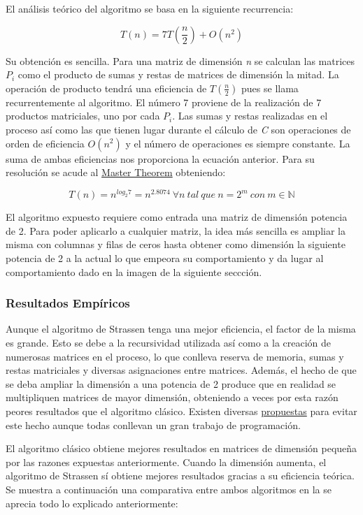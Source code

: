 \documentclass[]{article}
\begin{document}
El análisis teórico del algoritmo se basa en la siguiente recurrencia:

\[ T(n) = 7T(\frac{n}{2}) + O(n^2) \]

Su obtención es sencilla. Para una matriz de dimensión \emph{n} se
calculan las matrices $P_i$ como el producto de sumas y restas de
matrices de dimensión la mitad. La operación de producto tendrá una
eficiencia de $T(\frac{n}{2})$ pues se llama recurrentemente al
algoritmo. El número 7 proviene de la realización de 7 productos
matriciales, uno por cada $P_i$. Las sumas y restas realizadas en el
proceso así como las que tienen lugar durante el cálculo de \emph{C} son
operaciones de orden de eficiencia $O(n^2)$ y el número de operaciones
es siempre constante. La suma de ambas eficiencias nos proporciona la
ecuación anterior. Para su resolución se acude al
\href{http://en.wikipedia.org/wiki/Master_theorem}{Master Theorem}
obteniendo:

\[ T(n) = n^{log_2 7} = n^{2.8074} \ \forall n \ tal \ que \ n = 2^m \ con \ m \in \mathbb{N} \]

El algoritmo expuesto requiere como entrada una matriz de dimensión
potencia de 2. Para poder aplicarlo a cualquier matriz, la idea más
sencilla es ampliar la misma con columnas y filas de ceros hasta obtener
como dimensión la siguiente potencia de 2 a la actual lo que empeora su
comportamiento y da lugar al comportamiento dado en la imagen de la
siguiente seccción.

\subsubsection{Resultados Empíricos}\label{resultados-empiricos-3}

Aunque el algoritmo de Strassen tenga una mejor eficiencia, el factor de
la misma es grande. Esto se debe a la recursividad utilizada así como a
la creación de numerosas matrices en el proceso, lo que conlleva reserva
de memoria, sumas y restas matriciales y diversas asignaciones entre
matrices. Además, el hecho de que se deba ampliar la dimensión a una
potencia de 2 produce que en realidad se multipliquen matrices de mayor
dimensión, obteniendo a veces por esta razón peores resultados que el
algoritmo clásico. Existen diversas
\href{www.cs.duke.edu/~alvy/papers/sc98/}{propuestas} para evitar este
hecho aunque todas conllevan un gran trabajo de programación.

El algoritmo clásico obtiene mejores resultados en matrices de dimensión
pequeña por las razones expuestas anteriormente. Cuando la dimensión
aumenta, el algoritmo de Strassen sí obtiene mejores resultados gracias
a su eficiencia teórica. Se muestra a continuación una comparativa entre
ambos algoritmos en la se aprecia todo lo explicado anteriormente:
\end{document}
